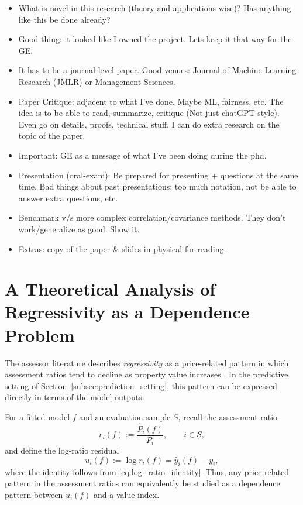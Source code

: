 \documentclass[12pt, draft]{article}
\theoremstyle{plain}
\theoremstyle{definition}
\newcommand{\1}{\mathbf{1}}
\begin{document}
\begin{itemize}
    \item What is novel in this research (theory and applications-wise)? Has anything like this be done already?
    \item Good thing: it looked like I owned the project. Lets keep it that way for the GE.
    \item It has to be a journal-level paper. Good venues: Journal of Machine Learning Research (JMLR) or Management Sciences. 
    \item Paper Critique: adjacent to what I've done. Maybe ML, fairness, etc. The idea is to be able to read, summarize, critique (Not just chatGPT-style). Even go on details, proofs, technical stuff. I can do extra research on the topic of the paper.
    \item Important: GE as a message of what I've been doing during the phd.
    \item Presentation (oral-exam): Be prepared for presenting + questions at the same time. Bad things about past presentations: too much notation, not be able to answer extra questions, etc.
    \item Benchmark v/s more complex correlation/covariance methods. They don't work/generalize as good. Show it.
    \item Extras: copy of the paper \& slides in physical for reading. 
\end{itemize}

\printbibliography %


\newpage

\appendix


\section{A Theoretical Analysis of Regressivity as a Dependence Problem}
\label{anex:regressivity_dependence}

The assessor literature describes \emph{regressivity} as a price-related pattern in which assessment ratios tend to decline as property value increases \cite{IAAO2013Ratio,IAAO2025ExposureRatio}. In the predictive setting of Section~\ref{subsec:prediction_setting}, this pattern can be expressed directly in terms of the model outputs.

For a fitted model $f$ and an evaluation sample $S$, recall the assessment ratio
\[
r_i(f):=\frac{\widehat P_i(f)}{P_i},
\qquad i\in S,
\]
and define the log-ratio residual
\[
u_i(f):=\log r_i(f)=\hat y_i(f)-y_i,
\]
where the identity follows from \eqref{eq:log_ratio_identity}. Thus, any price-related pattern in the assessment ratios can equivalently be studied as a dependence pattern between $u_i(f)$ and a value index.
\end{document}
